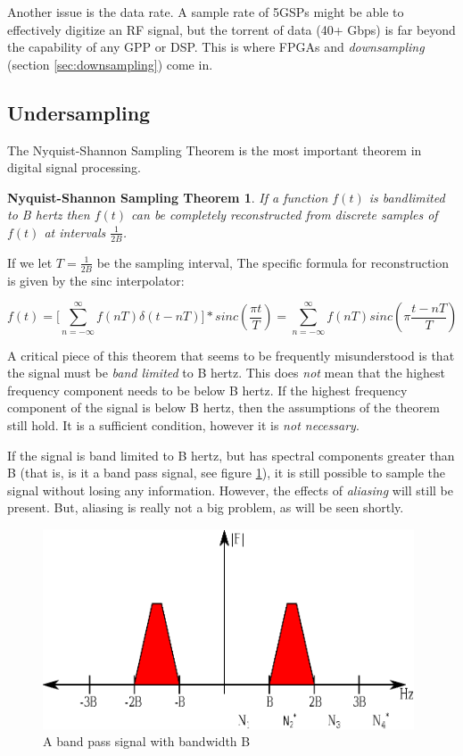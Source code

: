 \documentclass[a4paper, 12pt]{article}
\newtheorem{thm:NSST}{Nyquist-Shannon Sampling Theorem}
\begin{document}
Another issue is the data rate.  A sample rate of 5GSPs might be able to effectively digitize an RF signal, but the torrent of data (40+ Gbps) is far beyond the capability of any GPP or DSP.  This is where FPGAs and \textit{downsampling} (section \ref{sec:downsampling}) come in.

\subsection{Undersampling}
\label{sec:undersampling}
The Nyquist-Shannon Sampling Theorem is the most important theorem in digital signal processing.

\begin{thm:NSST}
\label{thm:NSST}
  If a function $f(t)$ is bandlimited to B hertz then $f(t)$ can be completely reconstructed from discrete samples of $f(t)$ at intervals $\frac{1}{2B}$.
\end{thm:NSST}

If we let $T = \frac{1}{2B}$ be the sampling interval, The specific formula for reconstruction is given by the sinc interpolator:

\begin{equation}
\label{eq:sinc_interpolation}
f(t) = \Big[\sum_{n=-\infty}^{\infty}{f(nT)\delta(t - nT)\Big]}*sinc(\frac{\pi t}{T}) = \sum_{n=-\infty}^{\infty}{f(nT)sinc(\pi\frac{t - nT}{T})}
\end{equation}

A critical piece of this theorem that seems to be frequently misunderstood is that the signal must be \textit{band limited} to B hertz.  This does \textit{not} mean that the highest frequency component needs to be below B hertz.  If the highest frequency component of the signal is below B hertz, then the assumptions of the theorem still hold.  It is a sufficient condition, however it is \textit{not necessary}.

If the signal is band limited to B hertz, but has spectral components greater than B (that is, is it a band pass signal, see figure \ref{fig:bandpass_signal}), it is still possible to sample the signal without losing any information.  However, the effects of \textit{aliasing} will still be present.  But, aliasing is really not a big problem, as will be seen shortly.

\begin{figure}[ht]
\caption{A band pass signal with bandwidth B}
\label{fig:bandpass_signal}
\centering
\includegraphics[width=11cm]{images/bandpass_signal.eps}
\end{figure}
\end{document}
